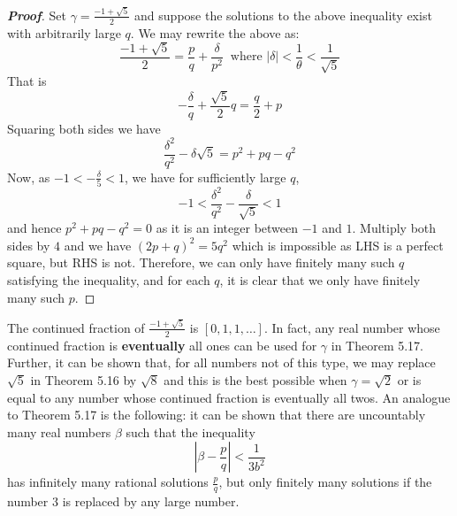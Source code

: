 \begin{proof}[\bf Proof] Set $\gamma=\frac{-1+\sqrt{5}}{2}$ and suppose the solutions to the above inequality exist with arbitrarily large $q$. We may rewrite the above as:
$$\frac{-1+\sqrt{5}}{2} = \frac{p}{q}+\frac{\delta}{p^2}~\text{ where }
|\delta|<\frac{1}{\theta}<\frac{1}{\sqrt{5}}$$
That is
$$-\frac{\delta}{q}+\frac{\sqrt{5}}{2}q = \frac{q}{2}+p$$
Squaring both sides we have
$$\frac{\delta^2}{q^2} - \delta \sqrt{5} = p^2 +pq -q^2$$
Now, as $-1 < -\frac{\delta}{5} <1$, we have for sufficiently large $q$,
$$-1 < \frac{\delta^2}{q^2} - \frac{\delta}{\sqrt{5}}<1$$
and hence $p^2+pq-q^2=0$ as it is an integer between $-1$ and $1$.
Multiply both sides by $4$ and we have $(2p+q)^2 = 5q^2$ which is impossible as LHS is a perfect square,
but RHS is not. Therefore, we can only have finitely many such $q$ satisfying the inequality, and for each $q$, it is clear that we only have finitely many such $p$.
\end{proof}
The continued fraction of $\frac{-1+\sqrt{5}}{2}$ is $[0,1,1,\ldots]$. In fact, any real number whose continued fraction is {\bf eventually} all ones can be used for $\gamma$ in Theorem 5.17. Further, it can be shown that, for all numbers not of this type, we may replace $\sqrt{5}$ in Theorem 5.16 by $\sqrt{8}$ and this is the best possible when $\gamma=\sqrt{2}$ or is equal to any number whose continued fraction is eventually all twos. An analogue to Theorem 5.17 is the following: it can be shown that there are uncountably many real numbers $\beta$ such that the inequality
$$\left|\beta-\frac{p}{q}\right| < \frac{1}{3b^2}$$
has infinitely many rational solutions $\frac{p}{q}$, but only finitely many solutions if the number
$3$ is replaced by any large number.
